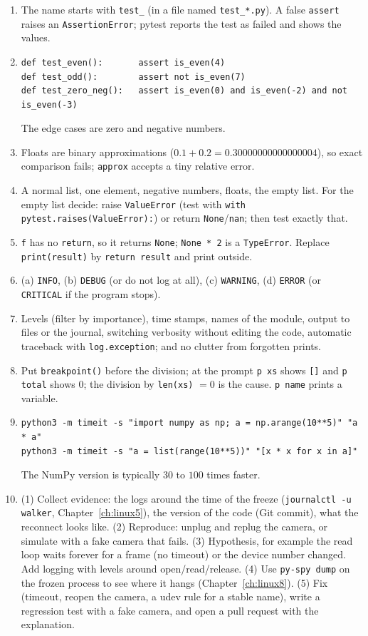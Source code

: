 \begin{enumerate}[label=\textbf{\ansnum.\arabic*}]
  \item The name starts with \texttt{test\_} (in a file named \texttt{test\_*.py}). A false \texttt{assert} raises an \texttt{AssertionError}; pytest reports the test as failed and shows the values.
  \item
\begin{verbatim}
def test_even():       assert is_even(4)
def test_odd():        assert not is_even(7)
def test_zero_neg():   assert is_even(0) and is_even(-2) and not is_even(-3)
\end{verbatim}
  The edge cases are zero and negative numbers.
  \item Floats are binary approximations ($0.1+0.2=0.30000000000000004$), so exact comparison fails; \texttt{approx} accepts a tiny relative error.
  \item A normal list, one element, negative numbers, floats, the empty list. For the empty list decide: raise \texttt{ValueError} (test with \verb!with pytest.raises(ValueError):!) or return \texttt{None}/\texttt{nan}; then test exactly that.
  \item \texttt{f} has no \texttt{return}, so it returns \texttt{None}; \verb!None * 2! is a \texttt{TypeError}. Replace \texttt{print(result)} by \texttt{return result} and print outside.
  \item (a) \texttt{INFO}, (b) \texttt{DEBUG} (or do not log at all), (c) \texttt{WARNING}, (d) \texttt{ERROR} (or \texttt{CRITICAL} if the program stops).
  \item Levels (filter by importance), time stamps, names of the module, output to files or the journal, switching verbosity without editing the code, automatic traceback with \texttt{log.exception}; and no clutter from forgotten prints.
  \item Put \texttt{breakpoint()} before the division; at the prompt \verb!p xs! shows \texttt{[]} and \verb!p total! shows $0$; the division by \verb!len(xs)! $=0$ is the cause. \texttt{p name} prints a variable.
  \item
\begin{verbatim}
python3 -m timeit -s "import numpy as np; a = np.arange(10**5)" "a * a"
python3 -m timeit -s "a = list(range(10**5))" "[x * x for x in a]"
\end{verbatim}
  The NumPy version is typically $30$ to $100$ times faster.
  \item[\textbf{\ansnum.10}] (1) Collect evidence: the logs around the time of the freeze (\texttt{journalctl -u walker}, Chapter~\ref{ch:linux5}), the version of the code (Git commit), what the reconnect looks like. (2) Reproduce: unplug and replug the camera, or simulate with a fake camera that fails. (3) Hypothesis, for example the read loop waits forever for a frame (no timeout) or the device number changed. Add logging with levels around open/read/release. (4) Use \texttt{py-spy dump} on the frozen process to see where it hangs (Chapter~\ref{ch:linux8}). (5) Fix (timeout, reopen the camera, a udev rule for a stable name), write a regression test with a fake camera, and open a pull request with the explanation.
\end{enumerate}
